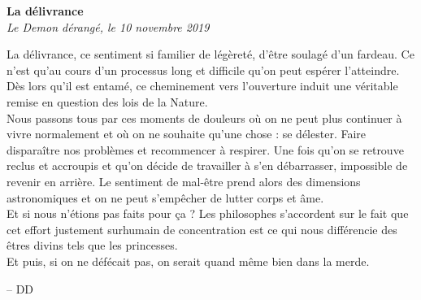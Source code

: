 \documentclass[french,12pt,amstex,a4paper]{article}
\begin{document}
\begin{center}
{\bf La délivrance}\\
{\it Le Demon dérangé, le 10 novembre 2019}\\
\end{center}

La délivrance, ce sentiment si familier de légèreté, d'être soulagé d'un fardeau. Ce n'est qu'au cours d'un processus long et difficile qu'on peut espérer l'atteindre. Dès lors qu'il est entamé, ce cheminement vers l'ouverture induit une véritable remise en question des lois de la Nature.\\

Nous passons tous par ces moments de douleurs où on ne peut plus continuer à vivre normalement et où on ne souhaite qu'une chose : se délester. Faire disparaître nos problèmes et recommencer à respirer. Une fois qu'on se retrouve reclus et accroupis et qu'on décide de travailler à s'en débarrasser, impossible de revenir en arrière. Le sentiment de mal-être prend alors des dimensions astronomiques et on ne peut s'empêcher de lutter corps et âme.\\

Et si nous n'étions pas faits pour ça ? Les philosophes s'accordent sur le fait que cet effort justement surhumain de concentration est ce qui nous différencie des êtres divins tels que les princesses.\\

Et puis, si on ne défécait pas, on serait quand même bien dans la merde.

\begin{flushright}
-- DD
\end{flushright}
\end{document}
